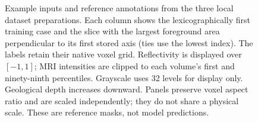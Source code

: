 \documentclass[12pt,a4paper]{article}
\begin{document}
\begin{figure}[p]
\caption{Example inputs and reference annotations from the three local
dataset preparations. Each column shows the lexicographically first
training case and the slice with the largest foreground area perpendicular
to its first stored axis (ties use the lowest index). The labels retain
their native voxel grid. Reflectivity is displayed over $[-1,1]$; MRI
intensities are clipped to each volume's first and ninety-ninth percentiles.
Grayscale uses 32 levels for display only. Geological depth increases
downward. Panels preserve voxel aspect ratio and are scaled independently;
they do not share a physical scale. These are reference masks, not model
predictions.}
\label{fig:dataset-examples}
\end{figure}
\end{document}
